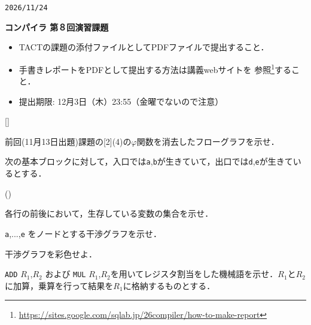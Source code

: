 \documentclass[dvipdfmx]{jarticle}
\newcounter{coffee}
\newcounter{bean}
\begin{document}
\begin{flushright}
    \verb|2026/11/24|
\end{flushright}
\begin{center}
    {\Large\bf コンパイラ 第８回演習課題}
\end{center}
\begin{itemize}
    \item TACTの課題の添付ファイルとしてPDFファイルで提出すること．
    \item 手書きレポートをPDFとして提出する方法は講義webサイトを
          参照\footnote{\url{https://sites.google.com/sqlab.jp/26compiler/how-to-make-report}}すること．
    \item 提出期限: {12月3日（木）23:55}（金曜でないので注意）
\end{itemize}

\begin{list}{[]}{}
    \item 前回(11月13日出題)課題の[2](4)の$\varphi$関数を消去したフローグラフを示せ．
    \item 次の基本ブロックに対して，入口では\verb|a|,\verb|b|が生きていて，出口では\verb|d|,\verb|e|が生きているとする．
    \begin{center}
    \end{center}
    \begin{list}{()}{}
        \item 各行の前後において，生存している変数の集合を示せ．
        \item \verb|a|,...,\verb|e| をノードとする干渉グラフを示せ．
        \item 干渉グラフを彩色せよ．
        \item \verb|ADD| $R_1$,$R_2$ および \verb|MUL| $R_1$,$R_2$を用いてレジスタ割当をした機械語を示せ．$R_1$と$R_2$に加算，乗算を行って結果を$R_1$に格納するものとする．
    \end{list}
\end{list}
\end{document}
